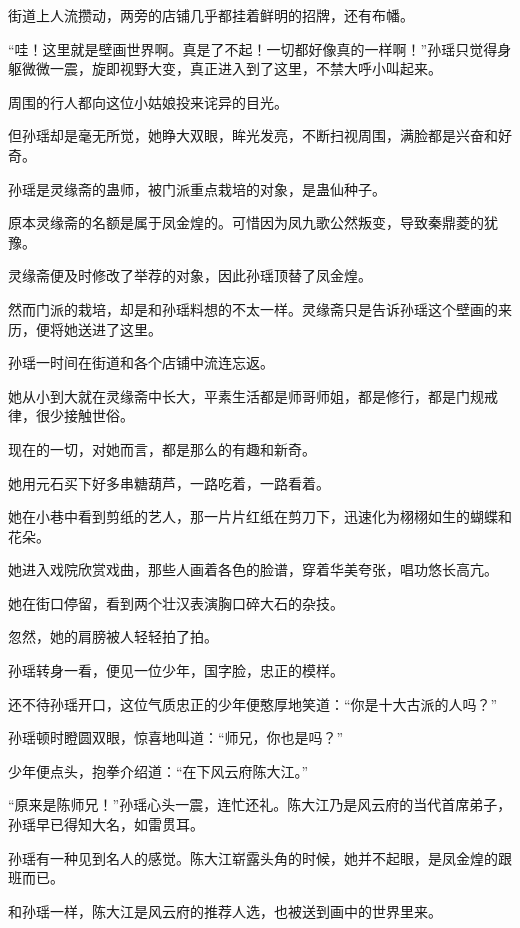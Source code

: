
\begin{this_body}

街道上人流攒动，两旁的店铺几乎都挂着鲜明的招牌，还有布幡。

“哇！这里就是壁画世界啊。真是了不起！一切都好像真的一样啊！”孙瑶只觉得身躯微微一震，旋即视野大变，真正进入到了这里，不禁大呼小叫起来。

周围的行人都向这位小姑娘投来诧异的目光。

但孙瑶却是毫无所觉，她睁大双眼，眸光发亮，不断扫视周围，满脸都是兴奋和好奇。

孙瑶是灵缘斋的蛊师，被门派重点栽培的对象，是蛊仙种子。

原本灵缘斋的名额是属于凤金煌的。可惜因为凤九歌公然叛变，导致秦鼎菱的犹豫。

灵缘斋便及时修改了举荐的对象，因此孙瑶顶替了凤金煌。

然而门派的栽培，却是和孙瑶料想的不太一样。灵缘斋只是告诉孙瑶这个壁画的来历，便将她送进了这里。

孙瑶一时间在街道和各个店铺中流连忘返。

她从小到大就在灵缘斋中长大，平素生活都是师哥师姐，都是修行，都是门规戒律，很少接触世俗。

现在的一切，对她而言，都是那么的有趣和新奇。

她用元石买下好多串糖葫芦，一路吃着，一路看着。

她在小巷中看到剪纸的艺人，那一片片红纸在剪刀下，迅速化为栩栩如生的蝴蝶和花朵。

她进入戏院欣赏戏曲，那些人画着各色的脸谱，穿着华美夸张，唱功悠长高亢。

她在街口停留，看到两个壮汉表演胸口碎大石的杂技。

忽然，她的肩膀被人轻轻拍了拍。

孙瑶转身一看，便见一位少年，国字脸，忠正的模样。

还不待孙瑶开口，这位气质忠正的少年便憨厚地笑道：“你是十大古派的人吗？”

孙瑶顿时瞪圆双眼，惊喜地叫道：“师兄，你也是吗？”

少年便点头，抱拳介绍道：“在下风云府陈大江。”

“原来是陈师兄！”孙瑶心头一震，连忙还礼。陈大江乃是风云府的当代首席弟子，孙瑶早已得知大名，如雷贯耳。

孙瑶有一种见到名人的感觉。陈大江崭露头角的时候，她并不起眼，是凤金煌的跟班而已。

和孙瑶一样，陈大江是风云府的推荐人选，也被送到画中的世界里来。


\end{this_body}
